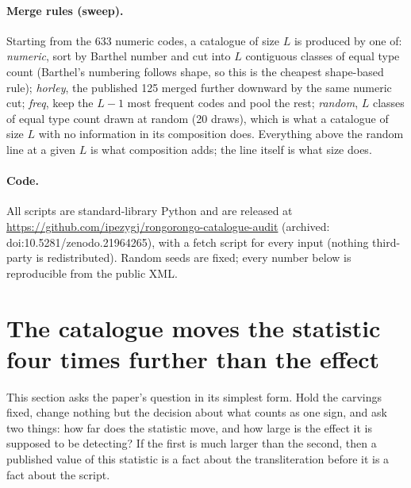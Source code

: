 \documentclass[11pt,a4paper]{article}
\begin{document}
\paragraph{Merge rules (sweep).} Starting from the 633 numeric codes, a catalogue of size $L$ is produced by one of: \emph{numeric}, sort by Barthel number and cut into $L$ contiguous classes of equal type count (Barthel's numbering follows shape, so this is the cheapest shape-based rule); \emph{horley}, the published 125 merged further downward by the same numeric cut; \emph{freq}, keep the $L-1$ most frequent codes and pool the rest; \emph{random}, $L$ classes of equal type count drawn at random (20 draws), which is what a catalogue of size $L$ with no information in its composition does. Everything above the random line at a given $L$ is what composition adds; the line itself is what size does.

\paragraph{Code.} All scripts are standard-library Python and are released at \url{https://github.com/ipezygj/rongorongo-catalogue-audit} (archived: doi:10.5281/zenodo.21964265), with a fetch script for every input (nothing third-party is redistributed). Random seeds are fixed; every number below is reproducible from the public XML.

\section{The catalogue moves the statistic four times further than the effect}
\label{sec:ladder}

This section asks the paper's question in its simplest form. Hold the carvings fixed, change nothing but the decision about what counts as one sign, and ask two things: how far does the statistic move, and how large is the effect it is supposed to be detecting? If the first is much larger than the second, then a published value of this statistic is a fact about the transliteration before it is a fact about the script.
\end{document}

